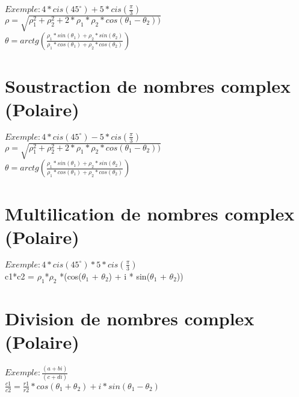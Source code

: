 $ Exemple : 4*cis(45^{\circ}) + 5*cis(\frac{\pi}{3})$\\

$\rho = \sqrt{\rho_1^{2}+\rho_2^{2} + 2 * \rho_1 * \rho_2 * cos(\theta_1-\theta_2))}$ \\

$\theta = arctg(\frac{\rho_1 * sin(\theta_1) + \rho_2 * sin(\theta_2)} {\rho_1 * cos(\theta_1) + \rho_2 * cos(\theta_2)})$ \\

\vspace{4mm} %
\section{Soustraction de nombres complex (Polaire)}

$ Exemple : 4*cis(45^{\circ}) - 5*cis(\frac{\pi}{3})$\\

$\rho = \sqrt{\rho_1^{2}+\rho_2^{2} + 2 * \rho_1 * \rho_2 * cos(\theta_1-\theta_2))}$ \\

$\theta = arctg(\frac{\rho_1 * sin(\theta_1) + \rho_2 * sin(\theta_2)} {\rho_1 * cos(\theta_1) + \rho_2 * cos(\theta_2)})$ \\

\vspace{4mm} %
\section{Multilication de nombres complex (Polaire)}

$ Exemple : 4*cis(45^{\circ}) * 5*cis(\frac{\pi}{3})$\\

c1*c2 = $\rho_1$*$\rho_2$ *(cos($\theta_1$ + $\theta_2$) + i * sin($\theta_1$ + $\theta_2$)) \\

\vspace{4mm} %
\section{Division de nombres complex (Polaire)}

$ Exemple : \frac{(a+bi)}{(c+di)}$\\

$\frac{c1}{c2} = \frac{r1}{r2} * cos(\theta_1+\theta_2) + i * sin(\theta_1-\theta_2)$ \\

